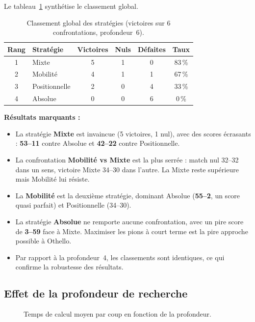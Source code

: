 \documentclass[12pt, a4paper]{article}
\begin{document}
Le tableau~\ref{tab:classement} synthétise le classement global.

\begin{table}[H]
\centering
\caption{Classement global des stratégies (victoires sur 6 confrontations, profondeur~6).}
\label{tab:classement}
\begin{tabular}{@{} c l c c c c @{}}
\toprule
\textbf{Rang} & \textbf{Stratégie} & \textbf{Victoires} & \textbf{Nuls} & \textbf{Défaites} & \textbf{Taux} \\
\midrule
1 & Mixte         & 5 & 1 & 0 & 83\,\% \\
2 & Mobilité      & 4 & 1 & 1 & 67\,\% \\
3 & Positionnelle & 2 & 0 & 4 & 33\,\% \\
4 & Absolue       & 0 & 0 & 6 & 0\,\%  \\
\bottomrule
\end{tabular}
\end{table}

\textbf{Résultats marquants :}
\begin{itemize}
    \item La stratégie \textbf{Mixte} est invaincue (5 victoires, 1 nul), avec des scores écrasants : \textbf{53--11} contre Absolue et \textbf{42--22} contre Positionnelle.
    \item La confrontation \textbf{Mobilité vs Mixte} est la plus serrée : match nul 32--32 dans un sens, victoire Mixte 34--30 dans l'autre. La Mixte reste supérieure mais Mobilité lui résiste.
    \item La \textbf{Mobilité} est la deuxième stratégie, dominant Absolue (\textbf{55--2}, un score quasi parfait) et Positionnelle (34--30).
    \item La stratégie \textbf{Absolue} ne remporte aucune confrontation, avec un pire score de \textbf{3--59} face à Mixte. Maximiser les pions à court terme est la pire approche possible à Othello.
    \item Par rapport à la profondeur~4, les classements sont identiques, ce qui confirme la robustesse des résultats.
\end{itemize}


\subsection{Effet de la profondeur de recherche}

\begin{figure}[H]
    \centering
    \caption{Temps de calcul moyen par coup en fonction de la profondeur.}
    \label{fig:profondeur}
\end{figure}
\end{document}
